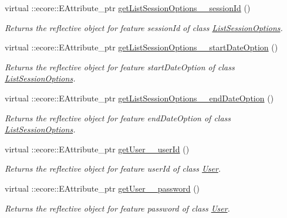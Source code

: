 \begin{DoxyCompactItemize}
virtual ::ecore::EAttribute\_\-ptr \hyperlink{classUMS__Data_1_1UMS__DataPackage_a6bcc65f519e33e2f53c3ddb9bcbbacc7}{getListSessionOptions\_\-\_\-sessionId} ()
\begin{DoxyCompactList}\small\item\em Returns the reflective object for feature sessionId of class \hyperlink{classUMS__Data_1_1ListSessionOptions}{ListSessionOptions}. \item\end{DoxyCompactList}\item 
virtual ::ecore::EAttribute\_\-ptr \hyperlink{classUMS__Data_1_1UMS__DataPackage_a3809ab575322cb5e23068db76d4ab9b6}{getListSessionOptions\_\-\_\-startDateOption} ()
\begin{DoxyCompactList}\small\item\em Returns the reflective object for feature startDateOption of class \hyperlink{classUMS__Data_1_1ListSessionOptions}{ListSessionOptions}. \item\end{DoxyCompactList}\item 
virtual ::ecore::EAttribute\_\-ptr \hyperlink{classUMS__Data_1_1UMS__DataPackage_a36bd192b55d7f1a6be4ebb7728e1b3a1}{getListSessionOptions\_\-\_\-endDateOption} ()
\begin{DoxyCompactList}\small\item\em Returns the reflective object for feature endDateOption of class \hyperlink{classUMS__Data_1_1ListSessionOptions}{ListSessionOptions}. \item\end{DoxyCompactList}\item 
virtual ::ecore::EAttribute\_\-ptr \hyperlink{classUMS__Data_1_1UMS__DataPackage_a13f31cdfb6e73eb0a38d16d3fadf5568}{getUser\_\-\_\-userId} ()
\begin{DoxyCompactList}\small\item\em Returns the reflective object for feature userId of class \hyperlink{classUMS__Data_1_1User}{User}. \item\end{DoxyCompactList}\item 
virtual ::ecore::EAttribute\_\-ptr \hyperlink{classUMS__Data_1_1UMS__DataPackage_a29c1fb2d97e26b2370a5591e04d5b2c6}{getUser\_\-\_\-password} ()
\begin{DoxyCompactList}\small\item\em Returns the reflective object for feature password of class \hyperlink{classUMS__Data_1_1User}{User}. \item\end{DoxyCompactList}\item 

\end{DoxyCompactItemize}
